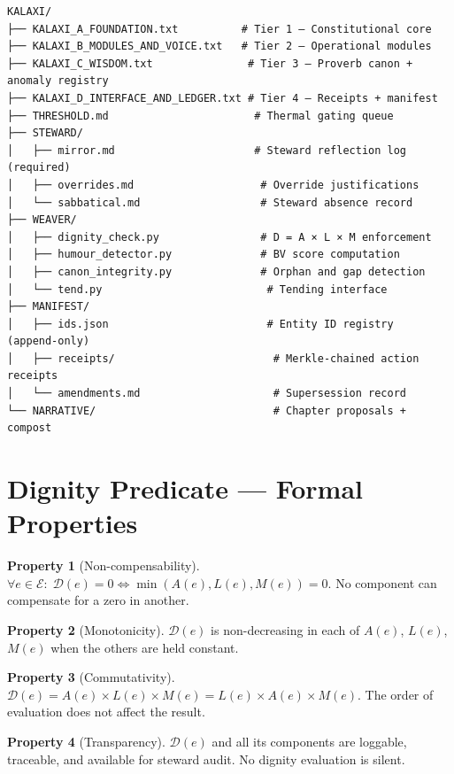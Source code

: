 \documentclass[12pt,a4paper]{article}
\theoremstyle{definition}
\newtheorem{property}{Property}[section]
\theoremstyle{remark}
\newcommand{\D}{\mathcal{D}}
\newcommand{\E}{\mathcal{E}}
\begin{document}
\begin{verbatim}
KALAXI/
├── KALAXI_A_FOUNDATION.txt          # Tier 1 – Constitutional core
├── KALAXI_B_MODULES_AND_VOICE.txt   # Tier 2 – Operational modules
├── KALAXI_C_WISDOM.txt               # Tier 3 – Proverb canon + anomaly registry
├── KALAXI_D_INTERFACE_AND_LEDGER.txt # Tier 4 – Receipts + manifest
├── THRESHOLD.md                       # Thermal gating queue
├── STEWARD/
│   ├── mirror.md                      # Steward reflection log (required)
│   ├── overrides.md                    # Override justifications
│   └── sabbatical.md                   # Steward absence record
├── WEAVER/
│   ├── dignity_check.py                # D = A × L × M enforcement
│   ├── humour_detector.py              # BV score computation
│   ├── canon_integrity.py              # Orphan and gap detection
│   └── tend.py                          # Tending interface
├── MANIFEST/
│   ├── ids.json                         # Entity ID registry (append‑only)
│   ├── receipts/                         # Merkle-chained action receipts
│   └── amendments.md                     # Supersession record
└── NARRATIVE/                            # Chapter proposals + compost
\end{verbatim}

\section{Dignity Predicate — Formal Properties}
\label{app:properties}

\begin{property}[Non-compensability]
$\forall e \in \E:\; \D(e) = 0 \iff \min(A(e),L(e),M(e)) = 0$.
No component can compensate for a zero in another.
\end{property}

\begin{property}[Monotonicity]
$\D(e)$ is non-decreasing in each of $A(e)$, $L(e)$, $M(e)$ when the others are held
constant.
\end{property}

\begin{property}[Commutativity]
$\D(e) = A(e) \times L(e) \times M(e) = L(e) \times A(e) \times M(e)$. The order of
evaluation does not affect the result.
\end{property}

\begin{property}[Transparency]
$\D(e)$ and all its components are loggable, traceable, and available for steward
audit. No dignity evaluation is silent.
\end{property}
\end{document}

